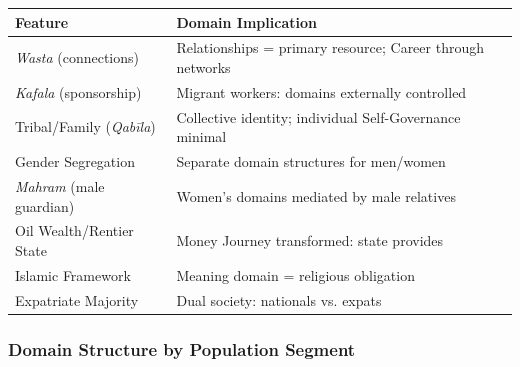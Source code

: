 \begin{center}
\begin{tabular}{@{}lp{7cm}@{}}
\toprule
\textbf{Feature} & \textbf{Domain Implication} \\
\midrule
\textit{Wasta} (connections) & Relationships = primary resource; Career through networks \\
\textit{Kafala} (sponsorship) & Migrant workers: domains externally controlled \\
Tribal/Family (\textit{Qabīla}) & Collective identity; individual Self-Governance minimal \\
Gender Segregation & Separate domain structures for men/women \\
\textit{Mahram} (male guardian) & Women's domains mediated by male relatives \\
Oil Wealth/Rentier State & Money Journey transformed: state provides \\
Islamic Framework & Meaning domain = religious obligation \\
Expatriate Majority & Dual society: nationals vs. expats \\
\bottomrule
\end{tabular}
\end{center}

\subsubsection{Domain Structure by Population Segment}

